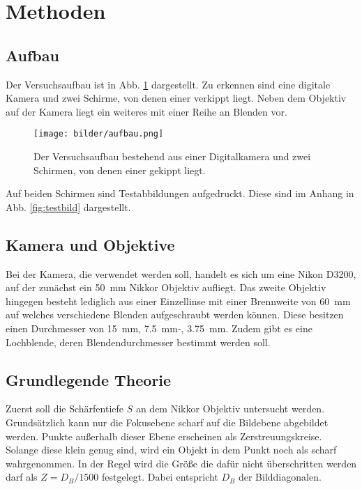 \section{Methoden} \label{sec:Methoden}	
	\subsection{Aufbau}			
			
		Der Versuchsaufbau ist in Abb. \ref{fig:aufbau} dargestellt.
		Zu erkennen sind eine digitale Kamera und zwei Schirme, von denen einer verkippt liegt.
		Neben dem Objektiv auf der Kamera liegt ein weiteres mit einer Reihe an Blenden vor.
		\begin{figure}[ht]
			\centering
			\texttt{[image: bilder/aufbau.png]}
			\caption{Der Versuchsaufbau bestehend aus einer Digitalkamera und zwei Schirmen, von denen einer gekippt liegt.\cite{WWU}}
			\label{fig:aufbau}	
		\end{figure}
	
		Auf beiden Schirmen sind Testabbildungen aufgedruckt.
		Diese sind im Anhang in Abb. \ref{fig:testbild} dargestellt.
		
	\subsection{Kamera und Objektive}
	 
	 	Bei der Kamera, die verwendet werden soll, handelt es sich um eine Nikon D3200, auf der zunächst ein \SI{50}{\milli\meter} Nikkor Objektiv aufliegt.
		Das zweite Objektiv hingegen besteht lediglich aus einer Einzellinse mit einer Brennweite von \SI{60}{\milli\meter} auf welches verschiedene Blenden aufgeschraubt werden können.
		Diese besitzen einen Durchmesser von \SI{15}{\milli\meter}, \SI{7,5}{\milli\meter}-, \SI{3,75}{\milli\meter}.
		Zudem gibt es eine Lochblende, deren Blendendurchmesser bestimmt werden soll.
		
	\subsection{Grundlegende Theorie} \label{subsec:Theorie} %
		
		Zuerst soll die Schärfentiefe $S$ an dem Nikkor Objektiv untersucht werden. 	
		Grundsätzlich kann nur die Fokusebene scharf auf die Bildebene abgebildet werden. 
		Punkte außerhalb dieser Ebene erscheinen als Zerstreuungskreise. 
		Solange diese klein genug sind, wird ein Objekt in dem Punkt noch als scharf wahrgenommen.
		In der Regel wird die Größe die dafür nicht überschritten werden darf als $Z = D_B/1500$ festgelegt.
		Dabei entspricht $D_B$ der Bilddiagonalen.
		
